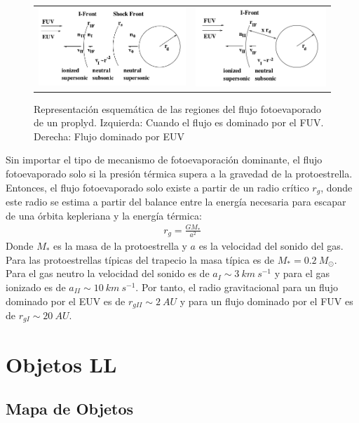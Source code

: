   \begin{figure}
    \begin{tabular}{cc}
      \includegraphics[width=0.5\linewidth]{./Figures/Johnstone-2} &
      \includegraphics[width=0.5\linewidth]{./Figures/Johnstone-3}
    \end{tabular}
    \label{fig:EUV-FUV-IF}
    \caption{Representación esquemática de las regiones del flujo
      fotoevaporado de un proplyd. Izquierda: Cuando el flujo es dominado
    por el FUV. Derecha: Flujo dominado por EUV \citep{Johnstone:1998}}
  \end{figure}
  

Sin importar el tipo de mecanismo de fotoevaporación dominante, el flujo
fotoevaporado solo si la presión térmica supera a la gravedad de la
protoestrella. Entonces, el flujo fotoevaporado solo existe a partir de
un radio crítico $r_g$, donde este radio se estima a partir del balance
entre la energía necesaria para escapar de una órbita kepleriana y la
energía térmica:
\begin{align}
  r_g = \frac{GM_*}{a^2}
\end{align}
Donde $M_*$ es la masa de la protoestrella y $a$ es la velocidad del sonido
del gas. Para las protoestrellas típicas del trapecio la masa típica es de
$M_* = 0.2~M_\odot$. Para el gas neutro la velocidad del sonido es de
$a_I \sim 3~km~s^{-1}$ y para el gas ionizado es de $a_{II} \sim 10~km~s^{-1}$.
Por tanto, el radio gravitacional para un flujo dominado por el EUV es de
$r_{gII} \sim 2~AU$ y para un flujo dominado por el FUV es de
$r_{gI} \sim 20~AU$.
\section{Objetos LL}
\subsection{Mapa de Objetos}